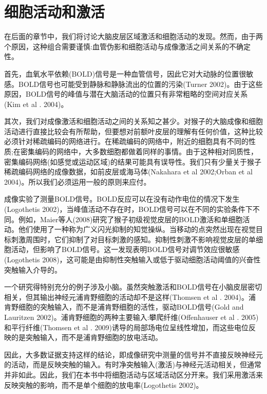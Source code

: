 \section{细胞活动和激活}
在后面的章节中，我们将讨论大脑皮层区域激活和细胞活动的发现。然而，由于两个原因，这种组合需要谨慎:血管伪影和细胞活动与成像激活之间关系的不确定性。

\par
首先，血氧水平依赖(BOLD)信号是一种血管信号，因此它对大动脉的位置很敏感。BOLD信号也可能受到静脉和静脉流出的位置的污染(Turner 2002)。由于这些原因，BOLD信号的峰值与潜在大脑活动的位置只有非常粗略的空间对应关系(Kim et al . 2004)。

\par
其次，我们对成像激活和细胞活动之间的关系知之甚少。对猴子的大脑成像和细胞活动进行直接比较会有所帮助，但要想对前额叶皮层的理解有任何价值，这种比较必须针对稀疏编码的网络进行。在稀疏编码的网络中，附近的细胞具有不同的性质;在密集编码的网络中，大多数细胞都做着同样的事情。由于这种相对同质性，密集编码网络(如感觉或运动区域)的结果可能具有误导性。我们只有少量关于猴子稀疏编码网络的成像数据，如前皮层或海马体(Nakahara et al 2002;Orban et al 2004)。所以我们必须运用一般的原则来应付。

\par
成像实验了测量BOLD信号。BOLD反应可以在没有动作电位的情况下发生(Logothetis 2002)，当峰值活动不存在时，BOLD信号可以在不同的实验条件下不同。例如，Maier等人(2008)研究了猴子初级视觉皮层的BOLD激活和单细胞活动。他们使用了一种称为广义闪光抑制的知觉操纵。当移动的点突然出现在视觉目标刺激周围时，它们抑制了对目标刺激的感知。抑制性刺激不影响视觉皮层的单细胞活动，但影响了BOLD信号。这一发现表明BOLD信号对调节效应很敏感(Logothetis 2008)，这可能是由抑制性突触输入或低于驱动细胞活动阈值的兴奋性突触输入介导的。

\par
一个研究得特别充分的例子涉及小脑。虽然突触激活和BOLD信号在小脑皮层密切相关，但其输出神经元浦肯野细胞的活动却不是这样(Thomsen et al . 2004)。浦肯野细胞的突触输入，而不是浦肯野细胞的活性，驱动BOLD信号(Gold and Lauritzen 2002)。浦肯野细胞的两种主要输入:攀爬纤维(Offenhauser et al . 2005)和平行纤维(Thomsen et al . 2009)诱导的局部场电位呈线性增加，而这些电位反映的是突触输入，而不是浦肯野细胞的放电活动。


\par
因此，大多数证据支持这样的结论，即成像研究中测量的信号并不直接反映神经元的活动，而是反映突触的输入。有时净突触输入(激活)与神经元活动相关，但通常并非如此。因此，我们在本书中将细胞活动与区域活动区分开来。我们采用激活来反映突触的影响，而不是单个细胞的放电率(Logothetis 2002)。

